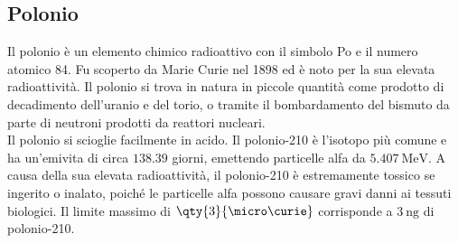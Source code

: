 \subsection{Polonio}
Il polonio è un elemento chimico radioattivo con il simbolo Po e il numero atomico 84. Fu scoperto da Marie Curie nel 1898 ed è noto per la sua elevata radioattività. Il polonio si trova in natura in piccole quantità come prodotto di decadimento dell'uranio e del torio, o tramite il bombardamento del bismuto da parte di neutroni prodotti da reattori nucleari.\\
Il polonio si scioglie facilmente in acido. Il polonio-210 è l'isotopo più comune e ha un'emivita di circa $138.39$ giorni, emettendo particelle alfa da $\qty{5.407}{\mega\electronvolt}$. A causa della sua elevata radioattività, il polonio-210 è estremamente tossico se ingerito o inalato, poiché le particelle alfa possono causare gravi danni ai tessuti biologici. Il limite massimo di $\qty{3}{\micro\curie}$ corrisponde a $\qty{3}{\nano\gram}$ di polonio-210.\\
